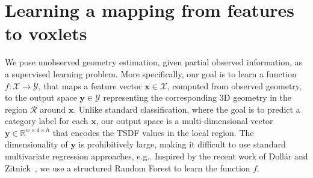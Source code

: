 \documentclass[10pt,twocolumn,letterpaper]{article}
\makeatletter
\renewcommand*{\eg}{e.g.\@\xspace}
\newcommand{\pixelidx}{\mathbf{s}}
\newcommand{\voxelgrid}{\mathcal{V}}
\newcommand{\note}[1]{\textcolor{blue}{NOTE: #1}}
\renewcommand{\paragraph}{\vspace{2pt}\noindent\textbf}
\makeatother
\begin{document}







\section{Learning a mapping from features to voxlets}
\label{sec:forest_train}
We pose unobserved geometry estimation, given partial observed information, as a supervised learning problem.
More specifically, our goal is to learn a function $f: \mathcal{X}\to \mathcal{Y}$, that maps a feature vector $\mathbf{x} \in \mathcal{X}$, computed from observed geometry, to the output space $\mathbf{y} \in \mathcal{Y}$ representing the corresponding 3D geometry in the region $\mathcal{R}$ around $\mathbf{x}$.
Unlike standard classification, where the goal is to predict a category label for each $\mathbf{x}$, our output space is a multi-dimensional vector $\mathbf{y} \in \mathbb{R}^{w\times{}d\times{}h}$ that encodes the TSDF values in the local region.
The dimensionality of $\mathbf{y}$ is prohibitively large, making it difficult to use standard multivariate regression approaches, \eg \cite{criminisi2013decision}.
Inspired by the recent work of Doll{\'a}r and Zitnick~\cite{dollar-iccv-2013}, we use a structured Random Forest to learn the function $f$.
\end{document}
